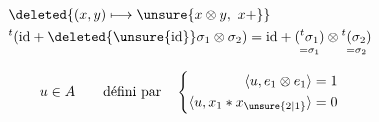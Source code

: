 \[
\begin{aligned}
&\deleted{(x,y)\longmapsto \unsure{x\otimes y,\ x+}}\\
&{}^t(\mathrm{id}+\deleted{\unsure{\mathrm{id}}}\sigma_1\otimes\sigma_2)
=\mathrm{id}+\underset{=\sigma_1}{({}^t\sigma_1)}\otimes\underset{=\sigma_2}{{}^t(\sigma_2)}
\end{aligned}
\]

\qquad{}

\[
u\in A\qquad\text{défini par}\quad
\left\{\begin{aligned}
\langle u,e_1\otimes e_1\rangle&=1\\
\langle u,x_1*x_{\unsure{2|1}}\rangle&=0
\end{aligned}\right.
\]

